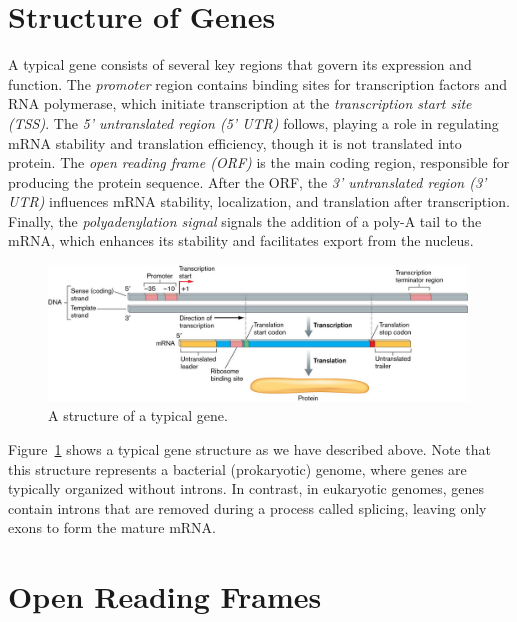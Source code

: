 \section{Structure of Genes}

A typical gene consists of several key regions that govern its expression
and function. The {\em promoter} region contains binding sites for transcription factors and RNA polymerase, which initiate transcription at the {\em transcription start site (TSS)}. The {\em 5' untranslated region (5' UTR)} follows, playing a role in regulating mRNA stability and translation efficiency, though it is not translated into protein. The {\em open reading frame (ORF)} is the main coding region, responsible for producing the protein sequence. After the ORF, the {\em 3' untranslated region (3' UTR)} influences mRNA stability, localization, and translation after transcription. Finally, the {\em polyadenylation signal} signals the addition of a poly-A tail to the mRNA, which enhances its stability and facilitates export from the nucleus.

\begin{figure}[ht]
    \centering
    \includegraphics[width=0.99\textwidth]{figs/genes/structure-gene-bacterial.png}
    \caption{A structure of a typical gene.}
    \label{fig:w-gene-structure}
\end{figure}

Figure~\ref{fig:w-gene-structure} shows a typical gene structure as we have described above. Note that this structure represents a bacterial (prokaryotic) genome, where genes are typically organized without introns. In contrast, in eukaryotic genomes, genes contain introns that are removed during a process called splicing, leaving only exons to form the mature mRNA.

\section{Open Reading Frames}

